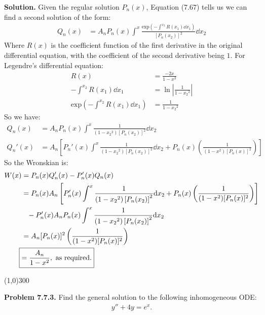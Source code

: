 \documentclass{article}
\begin{document}
\textbf{Solution.} Given the regular solution $P_n(x)$, Equation (7.67) tells us we can find a second solution of the form:
\begin{equation*}
\begin{aligned}
	Q_n(x) &= A_n P_n(x)\int^x \frac{\text{exp}\left(-\int^{x_2} R(x_1)\dd x_1\right)}{\left[P_n(x_2)\right]^2}\dd x_2
\end{aligned}
\end{equation*}
Where $R(x)$ is the coefficient function of the first derivative in the original differential equation, with the coefficient of the second derivative being $1$. For Legendre's differential equation:
\begin{equation*}
\begin{aligned}
	R(x) &= \frac{-2x}{1-x^2} \\
	-\int^{x_2} R(x_1)\dd x_1 &= \ln \left|\frac{1}{1-{x_2}^2}\right| \\
	\text{exp}\left(-\int^{x_2} R(x_1)\dd x_1\right) &= \frac{1}{1-{x_2}^2}
\end{aligned}
\end{equation*}
So we have:
\begin{equation*}
\begin{aligned}
	Q_n(x) &= A_n P_n(x)\int^x \frac{1}{(1-{x_2}^2)\left[P_n(x_2)\right]^2}\dd x_2 \\
	Q_n'(x) &= A_n\left[P_n'(x)\int^x \frac{1}{(1-{x_2}^2)\left[P_n(x_2)\right]^2}\dd x_2 + P_n(x)\left(\frac{1}{(1-x^2)[P_n(x)]^2}\right)\right]
\end{aligned}
\end{equation*}
So the Wronskian is:
\begin{equation*}
\begin{aligned}
	W(x) &= P_n(x)Q_n'(x) - P_n'(x)Q_n(x) \\
	&= P_n(x)A_n\left[P_n'(x)\int^x \frac{1}{(1-{x_2}^2)\left[P_n(x_2)\right]^2}\dd x_2 + P_n(x)\left(\frac{1}{(1-x^2)[P_n(x)]^2}\right)\right] \\
	&\phantom{=} - P_n'(x)A_n P_n(x)\int^x \frac{1}{(1-{x_2}^2)\left[P_n(x_2)\right]^2}\dd x_2 \\
	&= A_n [P_n(x)]^2\left(\frac{1}{(1-x^2)[P_n(x)]^2}\right) \\
	\Aboxed{&= \frac{A_n}{1-x^2},\text{ as required.}}
\end{aligned}
\end{equation*}

\begin{center}
\line(1,0){300}
\end{center}
\textbf{Problem 7.7.3.} Find the general solution to the following inhomogeneous ODE:
\begin{equation*}
\begin{aligned}
	y'' + 4y = e^x.
\end{aligned}
\end{equation*}
\end{document}
